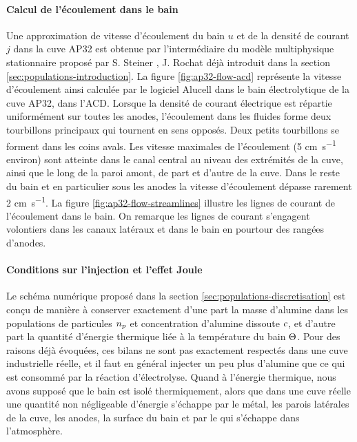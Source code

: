 \paragraph{Calcul de l'écoulement dans le bain} Une approximation de vitesse
d'écoulement du bain $u$ et de la densité de courant $j$ dans la cuve
AP32 est obtenue par l'intermédiaire du modèle multiphysique
stationnaire proposé par S. Steiner \cite{Steiner2009}, J. Rochat
\cite{Rochat2016} déjà introduit dans la section
\ref{sec:populations-introduction}. La figure \ref{fig:ap32-flow-acd}
représente la vitesse d'écoulement ainsi calculée par le logiciel
Alucell dans le bain électrolytique de la cuve AP32, dans
l'ACD. Lorsque la densité de courant électrique est répartie
uniformément sur toutes les anodes, l'écoulement dans les fluides
forme deux tourbillons principaux qui tournent en sens opposés. Deux
petits tourbillons se forment dans les coins avals. Les vitesse
maximales de l'écoulement (\num{5} \si{\centi\meter\per\second}
environ) sont atteinte dans le canal central au niveau des extrémités
de la cuve, ainsi que le long de la paroi amont, de part et d'autre de
la cuve. Dans le reste du bain et en particulier sous les anodes la
vitesse d'écoulement dépasse rarement \num{2}
\si{\centi\meter\per\second}. La figure
\ref{fig:ap32-flow-streamlines} illustre les lignes de courant de
l'écoulement dans le bain. On remarque les lignes de courant
s'engagent volontiers dans les canaux latéraux et dans le bain en
pourtour des rangées d'anodes.

\paragraph{Conditions sur l'injection et l'effet Joule}
Le schéma numérique proposé dans la section
\ref{sec:populations-discretisation} est conçu de manière à conserver
exactement d'une part la masse d'alumine dans les populations de
particules $n_p$ et concentration d'alumine dissoute
$c$, et d'autre part la quantité d'énergie thermique liée
à la température du bain $\Theta$. Pour des raisons déjà
évoquées, ces bilans ne sont pas exactement respectés dans une cuve
industrielle réelle, et il faut en général injecter un peu plus d'alumine
que ce qui est consommé par la réaction d'électrolyse. Quand à
l'énergie thermique, nous avons supposé que le bain est isolé
thermiquement, alors que dans une cuve réelle une quantité non
négligeable d'énergie s'échappe par le métal, les parois latérales de
la cuve, les anodes, la surface du bain et par le  qui
s'échappe dans l'atmosphère.

